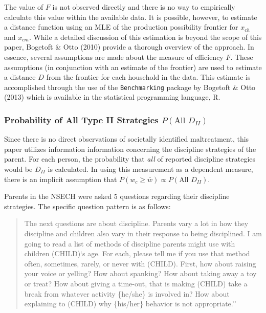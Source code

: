 \documentclass[]{elsarticle}
\begin{document}
The value of $F$ is not observed directly and there is no way to
empirically calculate this value within the available data. It is
possible, however, to estimate a distance function using an MLE of the
production possibility frontier for $x_{ch}$ and $x_{cm}$. While a
detailed discussion of this estimation is beyond the scope of this
paper, Bogetoft \& Otto (2010) provide a thorough overview of the
approach. In essence, several assumptions are made about the measure of
efficiency $F$. These assumptions (in conjunction with an estimate of
the frontier) are used to estimate a distance $D$ from the frontier for
each household in the data. This estimate is accomplished through the
use of the \texttt{Benchmarking} package by Bogetoft \& Otto (2013)
which is available in the statistical programming language, R.

\subsubsection{Probability of All Type II Strategies
$P(\text{All } D_{II})$}\label{probability-of-all-type-ii-strategies-ptextall-dux5fii}

Since there is no direct observations of societally identified
maltreatment, this paper utilizes information information concerning the
discipline strategies of the parent. For each person, the probability
that \emph{all} of reported discipline strategies would be $D_{II}$ is
calculated. In using this measurement as a dependent measure, there is
an implicit assumption that
$P(w_c \ge \bar{w}) \propto  P(\text{All } D_{II})$.

Parents in the NSECH were asked 5 questions regarding their discipline
strategies. The specific question pattern is as follows:

\begin{quote}
The next questions are about discipline. Parents vary a lot in how they
discipline and children also vary in their response to being
disciplined. I am going to read a list of methods of discipline parents
might use with children (CHILD)`s age. For each, please tell me if you
use that method often, sometimes, rarely, or never with (CHILD). First,
how about raising your voice or yelling? How about spanking? How about
taking away a toy or treat? How about giving a time-out, that is making
(CHILD) take a break from whatever activity \{he/she\} is involved in?
How about explaining to (CHILD) why \{his/her\} behavior is not
appropriate.''
\end{quote}
\end{document}
